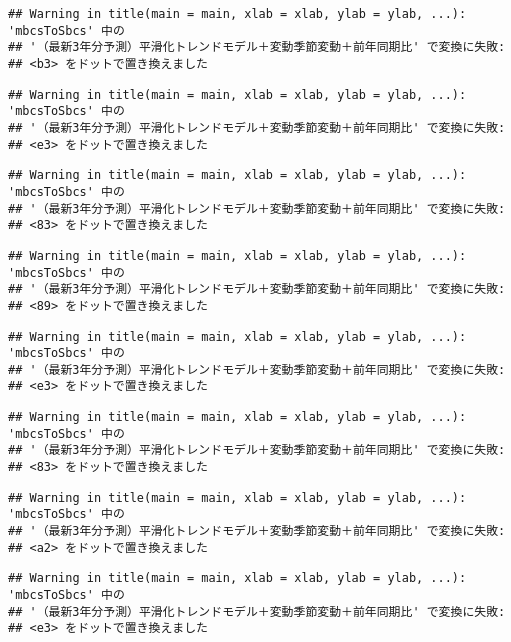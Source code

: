 \documentclass[]{article}
\begin{document}
\begin{verbatim}
## Warning in title(main = main, xlab = xlab, ylab = ylab, ...): 'mbcsToSbcs' 中の
## '（最新3年分予測）平滑化トレンドモデル＋変動季節変動＋前年同期比' で変換に失敗:
## <b3> をドットで置き換えました
\end{verbatim}

\begin{verbatim}
## Warning in title(main = main, xlab = xlab, ylab = ylab, ...): 'mbcsToSbcs' 中の
## '（最新3年分予測）平滑化トレンドモデル＋変動季節変動＋前年同期比' で変換に失敗:
## <e3> をドットで置き換えました
\end{verbatim}

\begin{verbatim}
## Warning in title(main = main, xlab = xlab, ylab = ylab, ...): 'mbcsToSbcs' 中の
## '（最新3年分予測）平滑化トレンドモデル＋変動季節変動＋前年同期比' で変換に失敗:
## <83> をドットで置き換えました
\end{verbatim}

\begin{verbatim}
## Warning in title(main = main, xlab = xlab, ylab = ylab, ...): 'mbcsToSbcs' 中の
## '（最新3年分予測）平滑化トレンドモデル＋変動季節変動＋前年同期比' で変換に失敗:
## <89> をドットで置き換えました
\end{verbatim}

\begin{verbatim}
## Warning in title(main = main, xlab = xlab, ylab = ylab, ...): 'mbcsToSbcs' 中の
## '（最新3年分予測）平滑化トレンドモデル＋変動季節変動＋前年同期比' で変換に失敗:
## <e3> をドットで置き換えました
\end{verbatim}

\begin{verbatim}
## Warning in title(main = main, xlab = xlab, ylab = ylab, ...): 'mbcsToSbcs' 中の
## '（最新3年分予測）平滑化トレンドモデル＋変動季節変動＋前年同期比' で変換に失敗:
## <83> をドットで置き換えました
\end{verbatim}

\begin{verbatim}
## Warning in title(main = main, xlab = xlab, ylab = ylab, ...): 'mbcsToSbcs' 中の
## '（最新3年分予測）平滑化トレンドモデル＋変動季節変動＋前年同期比' で変換に失敗:
## <a2> をドットで置き換えました
\end{verbatim}

\begin{verbatim}
## Warning in title(main = main, xlab = xlab, ylab = ylab, ...): 'mbcsToSbcs' 中の
## '（最新3年分予測）平滑化トレンドモデル＋変動季節変動＋前年同期比' で変換に失敗:
## <e3> をドットで置き換えました
\end{verbatim}
\end{document}
